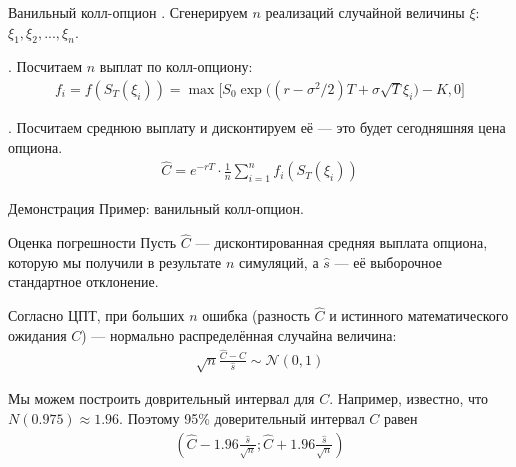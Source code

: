\documentclass{beamer}
\begin{document}
\begin{frame}{Ванильный колл-опцион}
. Сгенерируем $n$ реализаций случайной величины $\xi$: $\xi_1, \xi_2, ..., \xi_n$. 

. Посчитаем $n$ выплат по колл-опциону:
\begin{align*}
f_i = f(S_T(\xi_i)) = \max\Big[S_0 \exp\Big((r - \sigma^2/2)T + \sigma\sqrt{T}\xi_i\Big) - K, 0\Big]
\end{align*}

. Посчитаем среднюю выплату и дисконтируем её --- это будет сегодняшняя цена опциона.
\begin{align*}
\hat{C} = e^{-rT} \cdot \frac{1}{n}\sum\limits_{i=1}^{n}f_i(S_T(\xi_i))
\end{align*}
\end{frame}



\begin{frame}{Демонстрация}
\justify
Пример: ванильный колл-опцион.
\end{frame}



\begin{frame}{Оценка погрешности}
\justify
Пусть $\hat{C}$ --- дисконтированная средняя выплата 	опциона, которую мы получили в результате $n$ симуляций, а $\hat{s}$ --- её выборочное стандартное отклонение.

\justify
Согласно ЦПТ, при больших $n$ ошибка (разность $\hat{C}$ и истинного математического ожидания $C$) --- нормально распределённая случайна величина:
\begin{align*}
\sqrt{n}\frac{\hat{C} - C}{\hat{s}} \sim \mathcal{N}(0, 1)
\end{align*}

\justify
Мы можем построить доврительный интервал для $C$. Например, известно, что $N(0.975) \approx 1.96$. Поэтому 95\% доверительный интервал $C$ равен
\begin{align*}
\left(\hat{C} - 1.96\frac{\hat{s}}{\sqrt{n}}; \hat{C} + 1.96\frac{\hat{s}}{\sqrt{n}} \right)
\end{align*}  
\end{frame}
\end{document}
